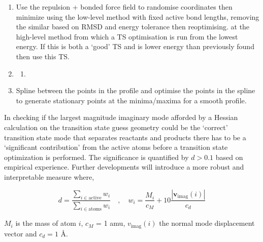 \documentclass[../../main.tex]{subfiles}
\begin{document}
\begin{enumerate}
\begin{enumerate}
	\end{enumerate}
	
	\item {}
	Use the repulsion + bonded force field to randomise
	coordinates then minimize using the low-level method
	with fixed active bond lengths, removing the similar
	based on RMSD and energy tolerance then reoptimising.
	at the high-level method from which a TS optimisation is
	run from the lowest energy. If this is both a ‘good’ TS
	and is lower energy than previously found then use this
	TS.
	
	\item {}
	\begin{enumerate}
		\item {}
	\end{enumerate}
	
	\item {}
	Spline between the points in the profile and optimise the
	points in the spline to generate stationary points at the
	minima/maxima for a smooth profile.

\end{enumerate}

In checking if the largest magnitude imaginary mode afforded by a Hessian calculation on the transition state guess geometry could be the ‘correct’ transition state mode that separates reactants and products there has to be a ‘significant contribution’ from the active atoms before a transition state optimization is performed. The significance is quantified by $d > 0.1$ based on empirical experience. Further \ade developments will introduce a more robust and interpretable measure where,


\begin{equation}
	d = \frac{\sum_{i \in \text{active}} w_i}{\sum_{i \in \text{atoms}} w_i} \quad,\quad w_i = \frac{M_i}{c_M} + 10 \frac{|\boldsymbol{v}_\text{imag}(i)|}{c_d}
\end{equation}

$M_i$ is the mass of atom $i$, $c_M$ = 1 amu, $v_\text{imag}(i)$ the normal mode displacement vector and $c_d = 1$ \AA. 
\end{document}
